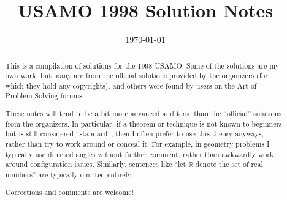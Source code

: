 \documentclass[11pt]{scrartcl}
\title{USAMO 1998 Solution Notes}
\date{\today}
\begin{document}
\maketitle

\begin{abstract}
This is a compilation of solutions
for the 1998 USAMO.
Some of the solutions are my own work,
but many are from the official solutions provided by the organizers
(for which they hold any copyrights),
and others were found by users on the Art of Problem Solving forums.

These notes will tend to be a bit more advanced and terse than the ``official''
solutions from the organizers.
In particular, if a theorem or technique is not known to beginners
but is still considered ``standard'', then I often prefer to
use this theory anyways, rather than try to work around or conceal it.
For example, in geometry problems I typically use directed angles
without further comment, rather than awkwardly work around configuration issues.
Similarly, sentences like ``let $\mathbb{R}$ denote the set of real numbers''
are typically omitted entirely.

Corrections and comments are welcome!
\end{abstract}

\tableofcontents
\newpage

\addtocounter{section}{-1}
\end{document}
